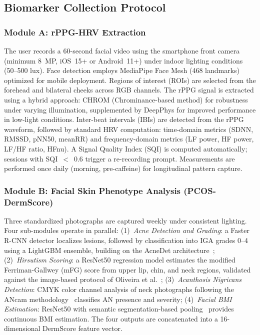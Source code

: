 \documentclass[conference]{IEEEtran}
\begin{document}
\subsection{Biomarker Collection Protocol}

\subsubsection{Module A: rPPG-HRV Extraction}
The user records a 60-second facial video using the smartphone front camera (minimum 8~MP, iOS~15+ or Android~11+) under indoor lighting conditions (50--500 lux). Face detection employs MediaPipe Face Mesh (468 landmarks) optimized for mobile deployment. Regions of interest (ROIs) are selected from the forehead and bilateral cheeks across RGB channels. The rPPG signal is extracted using a hybrid approach: CHROM (Chrominance-based method) for robustness under varying illumination, supplemented by DeepPhys for improved performance in low-light conditions. Inter-beat intervals (IBIs) are detected from the rPPG waveform, followed by standard HRV computation: time-domain metrics (SDNN, RMSSD, pNN50, meanRR) and frequency-domain metrics (LF power, HF power, LF/HF ratio, HFnu). A Signal Quality Index (SQI) is computed automatically; sessions with SQI~$<$~0.6 trigger a re-recording prompt. Measurements are performed once daily (morning, pre-caffeine) for longitudinal pattern capture.

\subsubsection{Module B: Facial Skin Phenotype Analysis (PCOS-DermScore)}
Three standardized photographs are captured weekly under consistent lighting. Four sub-modules operate in parallel: (1)~\textit{Acne Detection and Grading}: a Faster R-CNN detector localizes lesions, followed by classification into IGA grades 0--4 using a LightGBM ensemble, building on the AcneDet architecture~\cite{Huynh_2022}; (2)~\textit{Hirsutism Scoring}: a ResNet50 regression model estimates the modified Ferriman-Gallwey (mFG) score from upper lip, chin, and neck regions, validated against the image-based protocol of Oliveira et al.~\cite{Oliveira_2022}; (3)~\textit{Acanthosis Nigricans Detection}: CMYK color channel analysis of neck photographs following the ANcam methodology~\cite{Dhanoo_2024} classifies AN presence and severity; (4)~\textit{Facial BMI Estimation}: ResNet50 with semantic segmentation-based pooling~\cite{Yousaf_2021} provides continuous BMI estimation. The four outputs are concatenated into a 16-dimensional DermScore feature vector.
\end{document}
